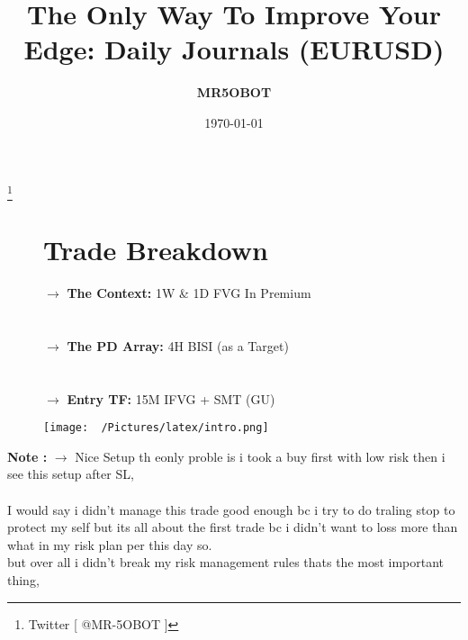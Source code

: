 \documentclass{article}
\title{The Only Way To Improve Your Edge: Daily Journals (EURUSD)}
\author{\textbf{MR5OBOT}}
\date{\today}
\begin{document}
\maketitle


\renewcommand{\thefootnote}{}
\footnote{Twitter [ @MR-5OBOT ]}

\renewcommand{\arraystretch}{1.5} %
\setlength{\tabcolsep}{10pt} %



\begin{figure}[h!]
\begin{minipage}{0.7\textwidth}
\section*{Trade Breakdown}
\vspace{0.3cm}

  $\rightarrow$ \textbf{The Context:}  1W \& 1D FVG In Premium  \\\\\\
$\rightarrow$ \textbf{The PD Array:} 4H BISI (as a Target) \\\\\\
  $\rightarrow$ \textbf{Entry TF:} 15M IFVG + SMT (GU)
\vspace{0.8cm}
\end{minipage}
\hfill
\begin{minipage}{0.35\textwidth}
  \texttt{[image: ~/Pictures/latex/intro.png]}
  \label{fig:image}
\end{minipage}
\end{figure}

\vspace{1cm}

\begin{center}
\begin{mdframed}[style=MyQuoteFrame]
  \textbf{Note :} $\rightarrow$ Nice Setup th eonly proble is i took a buy first with low risk then i see this setup after SL,\\\\
  I would say i didn't manage this trade good enough bc i try to do traling stop to protect my self but its all about the first trade bc i didn't want to loss more than what in my risk plan per this day so.\\
  but over all i didn't break my risk management rules thats the most important thing,
\end{mdframed}
\end{center}
\end{document}
